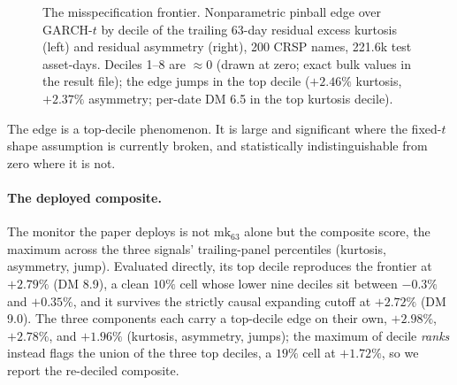 \documentclass[11pt]{article}
\theoremstyle{remark}
\begin{document}
\begin{figure}[t]
\centering
{}\hfill
{}
\caption{The misspecification frontier. Nonparametric pinball edge over
GARCH-$t$ by decile of the trailing 63-day residual excess kurtosis
(left) and residual asymmetry (right), 200 CRSP names, 221.6k test
asset-days. Deciles 1--8 are $\approx 0$ (drawn at zero; exact bulk
values in the result file); the edge jumps in the top decile
($+2.46\%$ kurtosis, $+2.37\%$ asymmetry; per-date DM 6.5 in the top
kurtosis decile).}
\label{fig:frontier}
\end{figure}

The edge is a top-decile phenomenon. It is large and significant
where the fixed-$t$ shape assumption is currently broken, and
statistically indistinguishable from zero where it is not.

\paragraph{The deployed composite.} The monitor the paper deploys is not
$\mathrm{mk}_{63}$ alone but the composite score, the maximum across the
three signals' trailing-panel percentiles (kurtosis, asymmetry, jump).
Evaluated directly, its top decile reproduces the frontier at $+2.79\%$
(DM 8.9), a clean $10\%$ cell whose lower nine deciles sit between
$-0.3\%$ and $+0.35\%$, and it survives the strictly causal expanding
cutoff at $+2.72\%$ (DM 9.0). The three components each carry a
top-decile edge on their own, $+2.98\%$, $+2.78\%$, and $+1.96\%$
(kurtosis, asymmetry, jumps); the maximum of decile \emph{ranks}
instead flags the union of the three top deciles, a $19\%$ cell at
$+1.72\%$, so we report the re-deciled composite.
\end{document}
